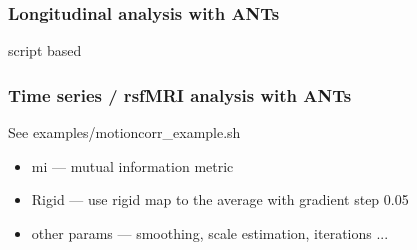 \documentclass[18pt]{beamer}
\begin{document}
\begin{frame}
\frametitle{Longitudinal analysis with ANTs}
script based 
\end{frame} 

\begin{frame}
\frametitle{Time series / rsfMRI analysis with ANTs}
See  examples/motioncorr\_example.sh

\begin{itemize}
\item mi --- mutual information metric 
\pause
\item Rigid --- use rigid map to the average with gradient step 0.05
\pause
\item other params --- smoothing, scale estimation, iterations ... 
\end{itemize}
\end{frame}
\end{document}
